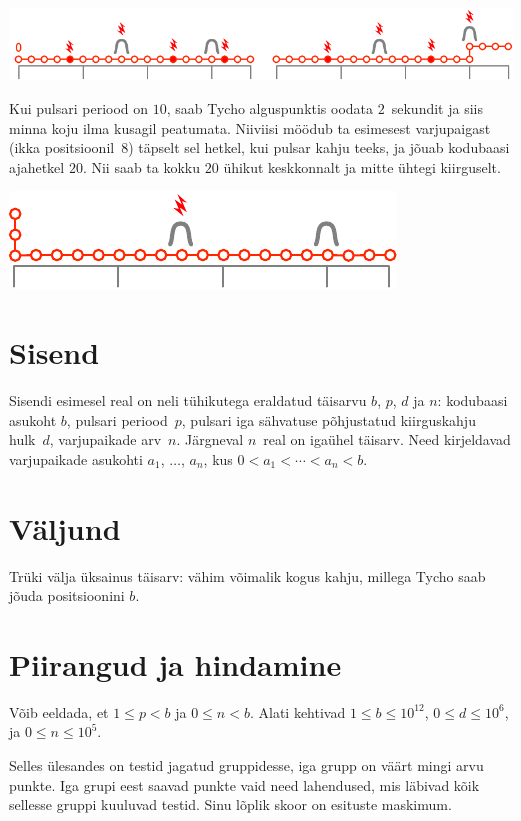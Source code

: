 \includegraphics[width=.8\textwidth]{img/sample1_2.pdf}

Kui pulsari periood on $10$, saab Tycho alguspunktis oodata $2$~sekundit ja siis minna koju
ilma kusagil peatumata.
Niiviisi möödub ta esimesest varjupaigast (ikka positsioonil~$8$) täpselt sel hetkel, kui pulsar
kahju teeks, ja jõuab kodubaasi ajahetkel $20$. Nii saab ta kokku $20$ ühikut keskkonnalt ja mitte
ühtegi kiirguselt.

\includegraphics[width=.4\textwidth]{img/sample3.pdf}

\section*{Sisend}

Sisendi esimesel real on neli tühikutega eraldatud täisarvu $b$, $p$, $d$ ja $n$:
kodubaasi asukoht $b$,
pulsari periood~$p$,
pulsari iga sähvatuse põhjustatud kiirguskahju hulk~$d$,
varjupaikade arv~$n$.
Järgneval $n$~real on igaühel täisarv. Need kirjeldavad varjupaikade asukohti
$a_1$, $\ldots$, $a_n$, kus $0<a_1<\cdots <a_n< b$. %

\section*{Väljund}

Trüki välja üksainus täisarv: vähim võimalik kogus kahju, millega Tycho saab jõuda positsioonini $b$.

\section*{Piirangud ja hindamine}

Võib eeldada, et
$1\leq p < b$ %
ja
$0 \leq n < b$. %
Alati kehtivad
$1\leq b\leq 10^{12}$, %
$0\leq d \leq 10^6$, %
ja
$0\leq n \leq 10^5$. %

Selles ülesandes on testid jagatud gruppidesse, iga grupp on väärt mingi arvu punkte.
Iga grupi eest saavad punkte vaid need lahendused, mis läbivad kõik sellesse gruppi kuuluvad testid.
Sinu lõplik skoor on esituste maskimum.


